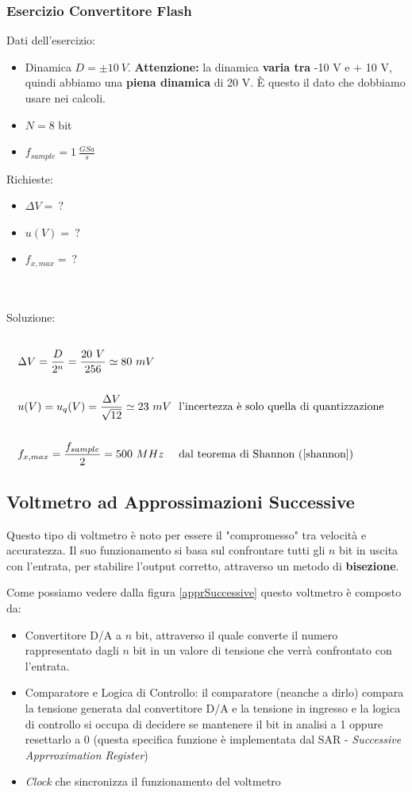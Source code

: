\documentclass[a4paper,11pt]{report}
\begin{document}
\subsubsection{Esercizio Convertitore Flash}
Dati dell'esercizio:
\begin{itemize}
  \item Dinamica $ D = \pm 10~V$. \textbf{Attenzione:} la dinamica \textbf{varia tra} -10 V e + 10 V, quindi abbiamo una \textbf{piena dinamica} di 20 V. È questo il dato che dobbiamo usare nei calcoli.
  \item $ N = 8 $ bit
  \item $ f_{sample} = 1~\frac{GSa}{s} $
\end{itemize}
Richieste:
\begin{itemize}
  \item $ \Delta V =~? $
  \item $ u(V) =~? $
  \item $ f_{x,max} =~? $
\end{itemize}
~\\ \\
Soluzione:
\begin{align*}
  \\
  &\Delta V = \frac{D}{2^n} = \frac{20~V}{256} \simeq 80~mV\\
  \\
  &u(V) = u_q(V) = \frac{\Delta V}{\sqrt{12}} \simeq 23~mV\text{~~l'incertezza è solo quella di quantizzazione}\\
  \\
  &f_{x,max} = \frac{f_{sample}}{2} = 500~MHz \text{~~~ dal teorema di Shannon (\ref{shannon})}
\end{align*}


\subsection{Voltmetro ad Approssimazioni Successive}
Questo tipo di voltmetro è noto per essere il "compromesso" tra velocità e accuratezza. Il suo funzionamento si basa sul confrontare tutti gli $ n $ bit in uscita con l'entrata, per stabilire l'output corretto, attraverso un metodo di \textbf{bisezione}.

Come possiamo vedere dalla figura \ref{apprSuccessive} questo voltmetro è composto da:
\begin{itemize}
  \item Convertitore D/A a $ n $ bit, attraverso il quale converte il numero rappresentato dagli $ n $ bit in un valore di tensione che verrà confrontato con l'entrata.
  \item Comparatore e Logica di Controllo: il comparatore (neanche a dirlo) compara la tensione generata dal convertitore D/A e la tensione in ingresso e la logica di controllo si occupa di decidere se mantenere il bit in analisi a 1 oppure resettarlo a 0 (questa specifica funzione è implementata dal SAR - \textit{Successive Apprroximation Register})
  \item \textit{Clock} che sincronizza il funzionamento del voltmetro
\end{itemize}
\end{document}
